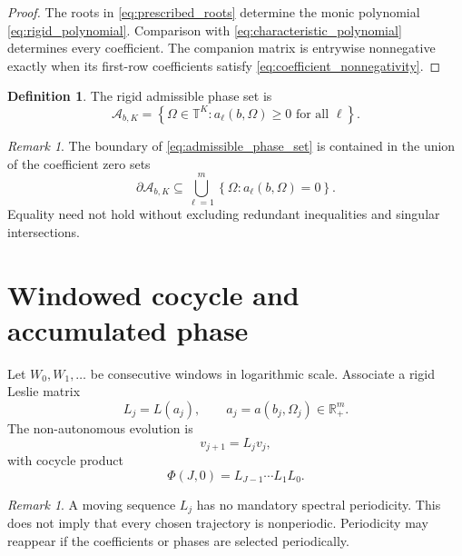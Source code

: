 \documentclass[11pt]{amsart}
\numberwithin{equation}{section}
\theoremstyle{plain}
\theoremstyle{definition}
\newtheorem{definition}[theorem]{Definition}
\theoremstyle{remark}
\newtheorem{remark}[theorem]{Remark}
\begin{document}
\begin{proof}
The roots in \eqref{eq:prescribed_roots} determine the monic polynomial \eqref{eq:rigid_polynomial}.  Comparison with \eqref{eq:characteristic_polynomial} determines every coefficient.  The companion matrix is entrywise nonnegative exactly when its first-row coefficients satisfy \eqref{eq:coefficient_nonnegativity}.
\end{proof}

\begin{definition}
\label{def:admissible_phase_set}
The rigid admissible phase set is
\begin{equation}
\mathcal A_{b,K}
=
\left\{
\Omega\in\mathbb T^K:
 a_\ell(b,\Omega)\geq0
 \text{ for all }\ell
\right\}.
\label{eq:admissible_phase_set}
\end{equation}
\end{definition}

\begin{remark}
\label{rem:boundary}
The boundary of \eqref{eq:admissible_phase_set} is contained in the union of the coefficient zero sets
\begin{equation}
\partial\mathcal A_{b,K}
\subseteq
\bigcup_{\ell=1}^{m}
\left\{\Omega:a_\ell(b,\Omega)=0\right\}.
\label{eq:admissible_boundary}
\end{equation}
Equality need not hold without excluding redundant inequalities and singular intersections.
\end{remark}

\section{Windowed cocycle and accumulated phase}
\label{sec:windowed_cocycle}

Let $W_0,W_1,\ldots$ be consecutive windows in logarithmic scale.  Associate a rigid Leslie matrix
\begin{equation}
L_j=L(a_j),
\qquad
a_j=a(b_j,\Omega_j)\in\mathbb R_+^m.
\label{eq:window_leslie}
\end{equation}
The non-autonomous evolution is
\begin{equation}
v_{j+1}=L_jv_j,
\label{eq:nonautonomous_evolution}
\end{equation}
with cocycle product
\begin{equation}
\Phi(J,0)=L_{J-1}\cdots L_1L_0.
\label{eq:cocycle_product}
\end{equation}

\begin{remark}
\label{rem:no_forced_periodicity}
A moving sequence $L_j$ has no mandatory spectral periodicity.  This does not imply that every chosen trajectory is nonperiodic.  Periodicity may reappear if the coefficients or phases are selected periodically.
\end{remark}
\end{document}
